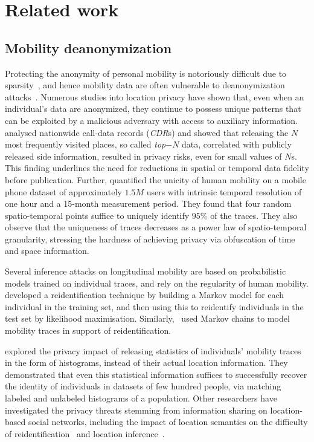 \section{Related work}


\subsection{Mobility deanonymization}

Protecting the anonymity of personal mobility is notoriously difficult due to sparsity~\citep{aggarwal2008}, and hence mobility data are often vulnerable to deanonymization attacks~\citep{Narayanan2008}.
Numerous studies into location privacy have shown that, even when an individual's data are anonymized, they continue to possess unique patterns that can be exploited by a malicious adversary with access to auxiliary information.
\textcite{Zang2011} analysed nationwide call-data records (\emph{CDR}s) and showed that releasing the $N$ most frequently visited places, so called \emph{top$-N$} data, correlated with publicly released side information, resulted in privacy risks, even for small values of $N$s.
This finding underlines the need for reductions in spatial or temporal data fidelity before publication.
Further, \textcite{DeMontjoye2013} quantified the unicity of human mobility on a mobile phone dataset of approximately $1.5M$ users with intrinsic temporal resolution of one hour and a 15-month measurement period.
They found that four random spatio-temporal points suffice to uniquely identify $ 95\% $ of the traces.
They also observe that the uniqueness of traces decreases as a power law of spatio-temporal granularity, stressing the hardness of achieving privacy via obfuscation of time and space information.

Several inference attacks on longitudinal mobility are based on probabilistic models trained on individual traces, and rely on the regularity of human mobility.
\textcite{deMulder08} developed a reidentification technique by building a Markov model for each individual in the training set, and then using this to reidentify individuals in the test set by likelihood maximisation.
Similarly,~\textcite{Gambs2014} used Markov chains to model mobility traces in support of reidentification.

\textcite{Naini2016a} explored the privacy impact of releasing statistics of individuals' mobility traces in the form of histograms, instead of their actual location information. They demonstrated that even this statistical information suffices to successfully recover the identity of individuals in datasets of few hundred people, via matching labeled and unlabeled histograms of a population.
Other researchers have investigated the privacy threats stemming from information sharing on location-based social networks, including the impact of location semantics on the difficulty of reidentification~\citep{privacyAndTheCity} and location inference~\citep{Agir}.

